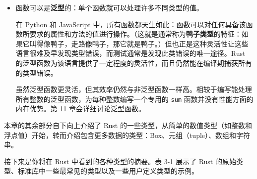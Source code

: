 \begin{itemize}
这两个定义是完全等效的，无论采用哪种方式，Rust 都会生成相同的机器码。类型推断让 Rust 具备了与动态类型语言相近的易读性，并且仍然能在编译期捕获类型错误。
\item 函数可以是\textbf{泛型}的：单个函数就可以处理许多不同类型的值。

在 Python 和 JavaScript 中，所有函数都天生如此：函数可以对任何具备该函数所要求的属性和方法的值进行操作。（这就是通常称为\textbf{鸭子类型}的特征：如果它叫得像鸭子，走路像鸭子，那它就是鸭子。）但也正是这种灵活性让这些语言很难及早发现类型错误，而测试通常是发现此类错误的唯一途径。Rust 的泛型函数为该语言提供了一定程度的灵活性，而且仍然能在编译期捕获所有的类型错误。

虽然泛型函数更灵活，但其效率仍然与非泛型函数一样高。相较于编写能处理所有整数的泛型函数，为每种整数编写一个专用的 \texttt{sum} 函数并没有性能方面的内在优势。第 11 章会详细讨论泛型函数。
\end{itemize}

本章的其余部分自下向上介绍了 Rust 的一些类型，从简单的数值类型（如整数和浮点值）开始，转而介绍包含更多数据的类型：Box、元组（tuple）、数组和字符串。

接下来是你将在 Rust 中看到的各种类型的摘要。表 3-1 展示了 Rust 的原始类型、标准库中一些最常见的类型以及一些用户定义类型的示例。


